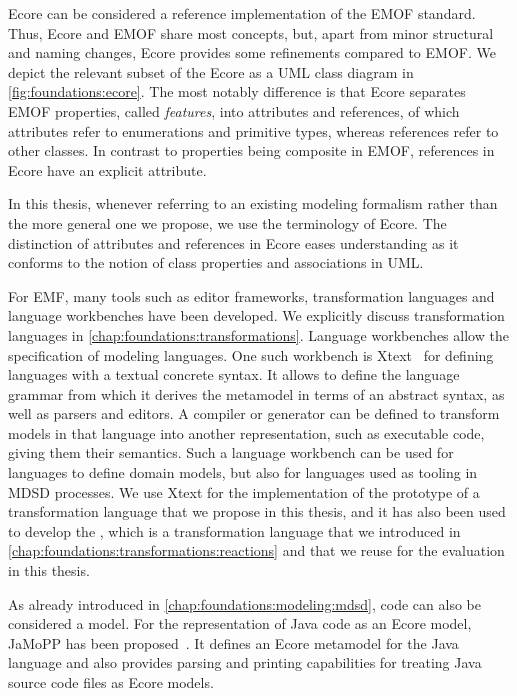 Ecore can be considered a reference implementation of the \gls{EMOF} standard.
Thus, Ecore and \gls{EMOF} share most concepts, but, apart from minor structural and naming changes, Ecore provides some refinements compared to \gls{EMOF}.
We depict the relevant subset of the Ecore \metametamodel as a \gls{UML} class diagram in \autoref{fig:foundations:ecore}.
The most notably difference is that Ecore separates \gls{EMOF} properties, called \emph{features}, into attributes and references, of which attributes refer to enumerations and primitive types, whereas references refer to other classes.
In contrast to properties being composite in \gls{EMOF}, references in Ecore have an explicit  attribute.

In this thesis, whenever referring to an existing modeling formalism rather than the more general one we propose, we use the terminology of Ecore.
The distinction of attributes and references in Ecore eases understanding as it conforms to the notion of class properties and associations in \gls{UML}.

For \gls{EMF}, many tools such as editor frameworks, transformation languages and language workbenches have been developed.
We explicitly discuss transformation languages in \autoref{chap:foundations:transformations}.
Language workbenches allow the specification of modeling languages.
One such workbench is Xtext~\cite{bettini2016Xtext-Book} for defining languages with a textual concrete syntax.
It allows to define the language grammar from which it derives the metamodel in terms of an abstract syntax, as well as parsers and editors.
A compiler or generator can be defined to transform models in that language into another representation, such as executable code, giving them their semantics.
Such a language workbench can be used for languages to define domain models, but also for languages used as tooling in \gls{MDSD} processes.
We use Xtext for the implementation of the prototype of a transformation language that we propose in this thesis, and it has also been used to develop the \reactionslanguage, which is a transformation language that we introduced in \autoref{chap:foundations:transformations:reactions} and that we reuse for the evaluation in this thesis.

As already introduced in \autoref{chap:foundations:modeling:mdsd}, code can also be considered a model.
For the representation of Java code as an Ecore model, JaMoPP has been proposed~\cite{heidenreich2010jamopp-SLE, heidenreich2009jamopp-report}.
It defines an Ecore metamodel for the Java language and also provides parsing and printing capabilities for treating Java source code files as Ecore models.



